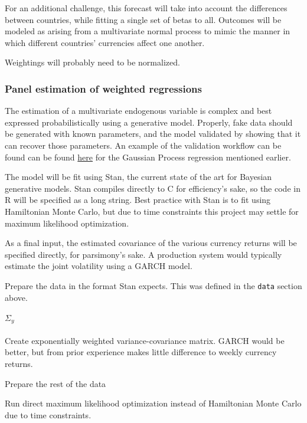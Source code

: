 \documentclass[]{article}
\let\oldparagraph\paragraph
\renewcommand{\paragraph}[1]{\oldparagraph{#1}\mbox{}}
\begin{document}
For an additional challenge, this forecast will take into account the
differences between countries, while fitting a single set of betas to
all. Outcomes will be modeled as arising from a multivariate normal
process to mimic the manner in which different countries' currencies
affect one another.

Weightings will probably need to be normalized.

\subsubsection{Panel estimation of weighted
regressions}\label{panel-estimation-of-weighted-regressions}

The estimation of a multivariate endogenous variable is complex and best
expressed probabilistically using a generative model. Properly, fake
data should be generated with known parameters, and the model validated
by showing that it can recover those parameters. An example of the
validation workflow can be found can be found
\href{https://charlesnaylor.github.io/gp_regression/doc/Specifying_the_Model-Full_Model.html}{here}
for the Gaussian Process regression mentioned earlier.

The model will be fit using Stan, the current state of the art for
Bayesian generative models. Stan compiles directly to C for efficiency's
sake, so the code in R will be specified as a long string. Best practice
with Stan is to fit using Hamiltonian Monte Carlo, but due to time
constraints this project may settle for maximum likelihood optimization.

As a final input, the estimated covariance of the various currency
returns will be specified directly, for parsimony's sake. A production
system would typically estimate the joint volatility using a GARCH
model.

Prepare the data in the format Stan expects. This was defined in the
\texttt{data} section above.

\paragraph{\texorpdfstring{\(\Sigma_y\)}{\textbackslash{}Sigma\_y}}\label{sigma_y}

Create exponentially weighted variance-covariance matrix. GARCH would be
better, but from prior experience makes little difference to weekly
currency returns.

Prepare the rest of the data

Run direct maximum likelihood optimization instead of Hamiltonian Monte
Carlo due to time constraints.
\end{document}
